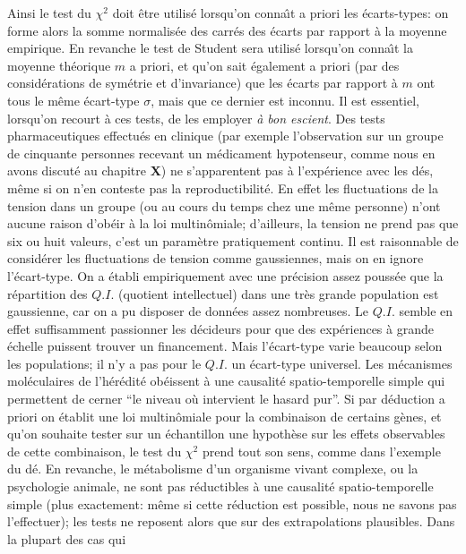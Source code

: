 \medskip
Ainsi le test du $\chi^2$ doit \^etre utilis\'e lorsqu'on conna{\^\i}t
a
priori les \'ecarts-types: on forme alors la somme normalis\'ee des carr\'es des \'ecarts par rapport \`a la moyenne empirique. En revanche 
le test de Student sera utilis\'e lorsqu'on conna{\^\i}t la moyenne
th\'eorique $m$ a priori, et qu'on sait \'egalement a priori (par des
consid\'erations de sym\'etrie et d'invariance) que les \'ecarts par 
rapport \`a $m$ ont tous le m\^eme \'ecart-type $\sigma$, mais que ce
dernier est inconnu. 
\medskip
Il est essentiel, lorsqu'on recourt \`a ces tests, de les employer {\it 
\`a bon escient}. Des tests pharmaceutiques effectu\'es en clinique (par
exemple l'observation sur un groupe de cinquante personnes recevant un
m\'edicament hypotenseur, comme nous en avons discut\'e au chapitre
{\bf X}) ne s'apparentent pas \`a l'exp\'erience avec les d\'es, m\^eme si
on n'en conteste pas la reproductibilit\'e. En effet les fluctuations de la
tension dans un groupe (ou au cours du temps chez une m\^eme personne)
n'ont aucune raison d'ob\'eir \`a la loi multin\^omiale; d'ailleurs, la
tension ne prend pas que six ou huit valeurs, c'est un param\`etre
pratiquement continu. Il est raisonnable de consid\'erer les fluctuations
de tension comme gaussiennes, mais on en ignore l'\'ecart-type.
\medskip 
On a \'etabli empiriquement avec une pr\'ecision assez pouss\'ee que
la r\'epartition des $Q.I.$ (quotient intellectuel) dans une tr\`es grande 
population est gaussienne, car on a pu disposer de donn\'ees assez 
nombreuses. Le $Q.I.$ semble en effet suffisamment passionner les 
d\'ecideurs pour que des exp\'eriences \`a grande \'echelle puissent 
trouver un financement. Mais l'\'ecart-type varie beaucoup selon
les populations; il n'y a pas pour le $Q.I.$ un \'ecart-type universel.
\medskip
Les m\'ecanismes mol\'eculaires de l'h\'er\'edit\'e ob\'eissent 
\`a une causalit\'e spatio-temporelle simple qui permettent
de cerner ``le niveau o\`u intervient le hasard pur''. Si par d\'eduction 
a priori on \'etablit une loi multin\^omiale pour la combinaison de
certains g\`enes, et qu'on souhaite tester sur un \'echantillon une
hypoth\`ese sur les effets observables de cette combinaison, le test 
du $\chi^2$ prend tout son sens, comme dans l'exemple du d\'e. En
revanche, le m\'etabolisme d'un organisme vivant complexe, ou la
psychologie animale, ne sont pas r\'eductibles \`a une causalit\'e
spatio-temporelle simple (plus exactement: m\^eme si cette r\'eduction
est possible, nous ne savons pas l'effectuer); les tests ne reposent 
alors que sur des extrapolations plausibles. Dans la plupart des cas qui
